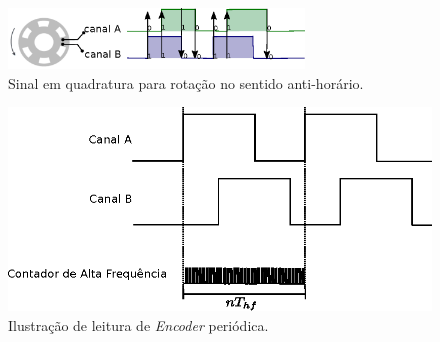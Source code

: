 

\begin{figure}[H]
    \centering
    \includegraphics[width=0.7\textwidth]{imagens/ilustracoes/sinal_enquadratura_sentido_CCW.eps}
    \caption{Sinal em quadratura para rotação no sentido anti-horário.}
    \label{fig:ccw_signal}
\end{figure}




\begin{figure}[H]
    \centering
    \includegraphics[width=\textwidth]{imagens/ilustracoes/ilustracao_medicao_encoder_por_periodo.eps}
    \caption{Ilustração de leitura de \emph{Encoder} periódica.}
\end{figure}

